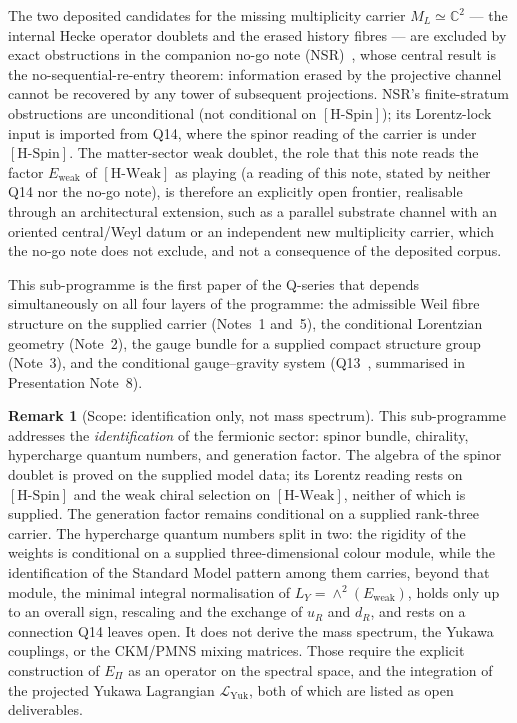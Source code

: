 \documentclass[11pt,a4paper]{article}
\theoremstyle{definition}
\newtheorem{remark}{Remark}
\newcommand{\Epi}{E_\Pi}
\newcommand{\Ew}{E_{\mathrm{weak}}}
\newcommand{\HSpin}{\ensuremath{[\mathrm{H\text{-}Spin}]}}
\newcommand{\HWeak}{\ensuremath{[\mathrm{H\text{-}Weak}]}}
\newcommand{\LYuk}{\mathcal{L}_{\mathrm{Yuk}}}
\begin{document}
    The two deposited candidates for the missing multiplicity carrier $M_L \simeq \mathbb{C}^2$
    --- the internal Hecke operator doublets and the erased history fibres --- are excluded by
    exact obstructions in the companion no-go note (NSR)~\cite{Beau2026nsr}, whose central result is
    the no-sequential-re-entry theorem: information erased by the projective channel cannot be
    recovered by any tower of subsequent projections.
    NSR's finite-stratum obstructions are unconditional (not conditional on \HSpin{}); its Lorentz-lock input is
    imported from Q14, where the spinor reading of the carrier is under \HSpin{}.
    The matter-sector weak doublet, the role that this note reads the factor $\Ew$ of \HWeak{} as playing (a reading
    of this note, stated by neither Q14 nor the no-go note), is therefore an explicitly open frontier,
    realisable through an architectural extension, such as a parallel substrate channel with an oriented
    central/Weyl datum or an independent new multiplicity carrier, which the no-go note does not exclude, and
    not a consequence of the deposited corpus.

    \medskip
    This sub-programme is the first paper of the Q-series that depends simultaneously on all
    four layers of the programme: the admissible Weil fibre structure on the supplied carrier
    (Notes~1 and~5), the conditional Lorentzian geometry (Note~2), the gauge bundle for a supplied
    compact structure group (Note~3), and the conditional gauge--gravity
    system (Q13~\cite{Beau2026q13}, summarised in Presentation Note~8).

    \begin{remark}[Scope: identification only, not mass spectrum]
This sub-programme addresses the \emph{identification} of the fermionic sector:
spinor bundle, chirality, hypercharge quantum numbers, and generation factor.
The algebra of the spinor doublet is proved on the supplied model data; its Lorentz reading rests on \HSpin{}
and the weak chiral selection on \HWeak{}, neither of which is supplied.
The generation factor remains conditional on a supplied rank-three carrier.
The hypercharge quantum numbers split in two: the rigidity of the weights is conditional on a
supplied three-dimensional colour module, while the identification of the Standard Model pattern
    among them carries, beyond that module, the minimal integral normalisation of $L_Y = \wedge^2(\Ew)$, holds only up
to an overall sign, rescaling and the exchange of $u_R$ and $d_R$, and rests on a connection Q14 leaves open.
It does not derive the mass spectrum, the Yukawa couplings, or the CKM/PMNS mixing
matrices.
Those require the explicit construction of $\Epi$ as an operator on the spectral space,
and the integration of the projected Yukawa Lagrangian $\LYuk$, both of which
are listed as open deliverables.
    \end{remark}
\end{document}
